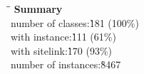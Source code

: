 \vfill
\begin{tabbing}
\hspace*{15mm}\=\hspace*{32mm}\=\kill
\>\textbf{Summary}\\
\>number of classes:\`181 (100\%)\\
\>with instance:\`111 (61\%)\\
\>with sitelink:\`170 (93\%)
\\\>number of instances:\`8467
\end{tabbing}
